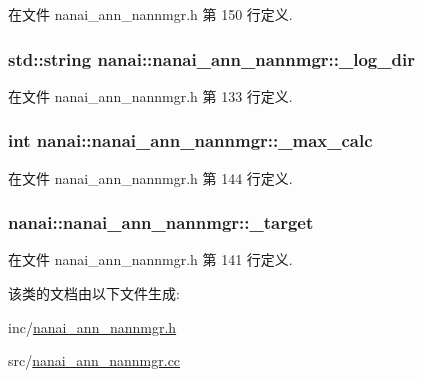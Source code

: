 在文件 nanai\+\_\+ann\+\_\+nannmgr.\+h 第 150 行定义.

\hypertarget{classnanai_1_1nanai__ann__nannmgr_a7d3908d8d93cc40191ec8f20f4808ba0}{}
\subsubsection[{\+\_\+log\+\_\+dir}]{\setlength{\rightskip}{0pt plus 5cm}std\+::string nanai\+::nanai\+\_\+ann\+\_\+nannmgr\+::\+\_\+log\+\_\+dir\hspace{0.3cm}{\ttfamily [protected]}}\label{classnanai_1_1nanai__ann__nannmgr_a7d3908d8d93cc40191ec8f20f4808ba0}


在文件 nanai\+\_\+ann\+\_\+nannmgr.\+h 第 133 行定义.

\hypertarget{classnanai_1_1nanai__ann__nannmgr_a7133133957796b1b5b75e8d761b54866}{}
\subsubsection[{\+\_\+max\+\_\+calc}]{\setlength{\rightskip}{0pt plus 5cm}int nanai\+::nanai\+\_\+ann\+\_\+nannmgr\+::\+\_\+max\+\_\+calc\hspace{0.3cm}{\ttfamily [protected]}}\label{classnanai_1_1nanai__ann__nannmgr_a7133133957796b1b5b75e8d761b54866}


在文件 nanai\+\_\+ann\+\_\+nannmgr.\+h 第 144 行定义.

\hypertarget{classnanai_1_1nanai__ann__nannmgr_a384127c4c4058bc4b28bdf928d59588a}{}
\subsubsection[{\+\_\+target}]{ nanai\+::nanai\+\_\+ann\+\_\+nannmgr\+::\+\_\+target\hspace{0.3cm}{\ttfamily [protected]}}\label{classnanai_1_1nanai__ann__nannmgr_a384127c4c4058bc4b28bdf928d59588a}


在文件 nanai\+\_\+ann\+\_\+nannmgr.\+h 第 141 行定义.



该类的文档由以下文件生成\+:\begin{DoxyCompactItemize}
\item 
inc/\hyperlink{nanai__ann__nannmgr_8h}{nanai\+\_\+ann\+\_\+nannmgr.\+h}\item 
src/\hyperlink{nanai__ann__nannmgr_8cc}{nanai\+\_\+ann\+\_\+nannmgr.\+cc}\end{DoxyCompactItemize}
